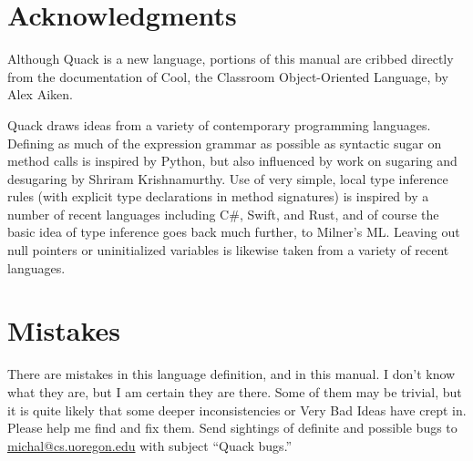 \documentclass[11pt]{article}
\begin{document}
\section{Acknowledgments}

Although Quack is a new language, 
portions of this manual are cribbed directly from the 
documentation of 
Cool, the Classroom Object-Oriented
Language, by Alex Aiken. 

Quack draws ideas from a variety of contemporary programming
languages.  
Defining as much of the expression grammar as possible as syntactic
sugar on method calls is inspired by Python, but also influenced by
work on sugaring and desugaring by Shriram Krishnamurthy.  Use of very
simple, local type inference rules (with explicit type declarations in method
signatures) is inspired by a number of recent languages including C\#,
Swift, and Rust, and of course the basic idea of type inference 
goes back much further, to Milner's ML.  Leaving out null pointers or
uninitialized variables 
is likewise taken from a variety of recent languages. 

\clearpage
\section*{Mistakes}

There are mistakes in this language definition, and in this manual.  I
don't know what they are, but I am certain they are there.  Some of
them may be trivial, but it is quite likely that some deeper
inconsistencies or Very Bad Ideas have crept in.  Please help me find
and fix them.  Send sightings of definite and possible bugs to 
\url{michal@cs.uoregon.edu} with subject ``Quack bugs.'' 
\end{document}
